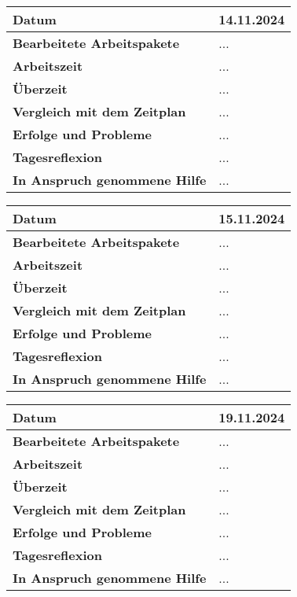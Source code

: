 \begin{longtable}{p{}|p{}}
	\hline
	\textbf{Datum}                       & 14.11.2024            \\
	\hline
	\textbf{Bearbeitete Arbeitspakete}   & ...                  \\
	\hline
	\textbf{Arbeitszeit}                 & ...                                    \\
	\hline
	\textbf{Überzeit}                    & ...                                    \\
	\hline
	\textbf{Vergleich mit dem Zeitplan}  & ... \\
	\hline
	\textbf{Erfolge und Probleme} & ...
	\\
	\hline
	\textbf{Tagesreflexion} & ...
	\\
	\hline
	\textbf{In Anspruch genommene Hilfe} & ...                              \\
	\hline
\end{longtable}\label{tab:arbeitsprotokoll-14.11.2024}
\newpage

\begin{longtable}{p{}|p{}}
	\hline
	\textbf{Datum}                       & 15.11.2024            \\
	\hline
	\textbf{Bearbeitete Arbeitspakete}   & ...                  \\
	\hline
	\textbf{Arbeitszeit}                 & ...                                    \\
	\hline
	\textbf{Überzeit}                    & ...                                    \\
	\hline
	\textbf{Vergleich mit dem Zeitplan}  & ... \\
	\hline
	\textbf{Erfolge und Probleme} & ...
	\\
	\hline
	\textbf{Tagesreflexion} & ...
	\\
	\hline
	\textbf{In Anspruch genommene Hilfe} & ...                              \\
	\hline
\end{longtable}\label{tab:arbeitsprotokoll-15.11.2024}
\newpage

\begin{longtable}{p{}|p{}}
	\hline
	\textbf{Datum}                       & 19.11.2024            \\
	\hline
	\textbf{Bearbeitete Arbeitspakete}   & ...                  \\
	\hline
	\textbf{Arbeitszeit}                 & ...                                    \\
	\hline
	\textbf{Überzeit}                    & ...                                    \\
	\hline
	\textbf{Vergleich mit dem Zeitplan}  & ... \\
	\hline
	\textbf{Erfolge und Probleme} & ...
	\\
	\hline
	\textbf{Tagesreflexion} & ...
	\\
	\hline
	\textbf{In Anspruch genommene Hilfe} & ...                              \\
	\hline
\end{longtable}\label{tab:arbeitsprotokoll-19.11.2024}
\newpage

